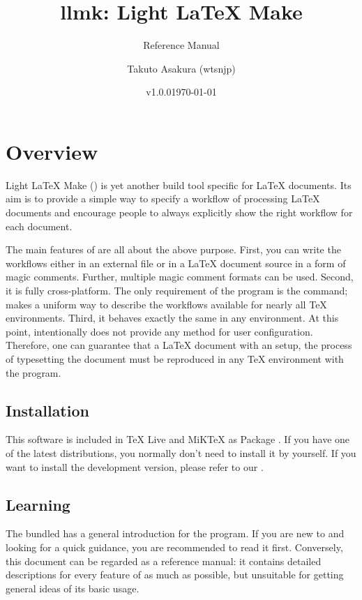\documentclass[draft]{llmk-doc}
\title{llmk: Light {\LaTeX} Make}
\author{Takuto Asakura (wtsnjp)}
\subtitle{Reference Manual}
\date{v1.0.0\quad\today}
\begin{document}
\maketitle

\section{Overview}

Light {\LaTeX} Make () is yet another build tool specific for
{\LaTeX} documents. Its aim is to provide a simple way to specify a workflow of
processing {\LaTeX} documents and encourage people to always explicitly show
the right workflow for each document.

The main features of  are all about the above purpose. First, you
can write the workflows either in an external file  or in a
{\LaTeX} document source in a form of magic comments. Further, multiple magic
comment formats can be used. Second, it is fully cross-platform. The only
requirement of the program is the  command;  makes a
uniform way to describe the workflows available for nearly all {\TeX}
environments. Third, it behaves exactly the same in any environment. At this
point,  intentionally does not provide any method for user
configuration. Therefore, one can guarantee that a {\LaTeX} document with an
 setup, the process of typesetting the document must be reproduced
in any {\TeX} environment with the program.

\subsection{Installation}

This software is included in {\TeX} Live and MiK{\TeX} as Package
. If you have one of the latest distributions, you
normally don't need to install it by yourself. If you want to install the
development version, please refer to our {\README}.

\subsection{Learning }

The bundled {\README} has a general introduction for the program. If you are
new to  and looking for a quick guidance, you are recommended to
read it first. Conversely, this document can be regarded as a reference manual:
it contains detailed descriptions for every feature of  as much as
possible, but unsuitable for getting general ideas of its basic usage.
\end{document}

